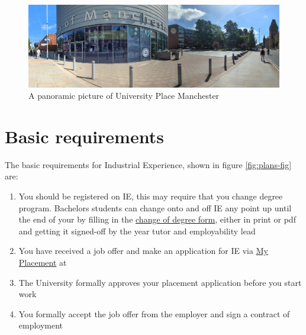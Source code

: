 \documentclass[
]{book}
\providecommand{\tightlist}{%
  \setlength{\itemsep}{0pt}\setlength{\parskip}{0pt}}
\begin{document}
\begin{figure}

{\centering \includegraphics[width=1\linewidth]{images/uniplace} 

}

\caption{A panoramic picture of University Place Manchester}\label{fig:reqs-fig}
\end{figure}



\section{Basic requirements}\label{basic}

The basic requirements for Industrial Experience, shown in figure \ref{fig:plans-fig} are:

\begin{enumerate}
\def\labelenumi{\arabic{enumi}.}
\tightlist
\item
  You should be registered on IE, this may require that you change degree program. Bachelors students can change onto and off IE any point up until the end of your by filling in the \href{https://studentnet.cs.manchester.ac.uk/ugt/changedegree.php}{change of degree form}, either in print or pdf and getting it signed-off by the year tutor and employability lead \citep{changedegree}
\item
  You have received a job offer and make an application for IE via \href{https://studentmobility.manchester.ac.uk}{My Placement} at \citep{myplacement}
\item
  The University formally approves your placement application before you start work
\item
  You formally accept the job offer from the employer and sign a contract of employment
\end{enumerate}
\end{document}

